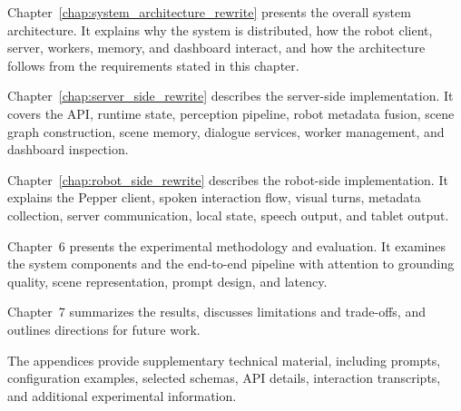 Chapter~\ref{chap:system_architecture_rewrite} presents the overall system architecture. It explains why the system is distributed, how the robot client, server, workers, memory, and dashboard interact, and how the architecture follows from the requirements stated in this chapter.

Chapter~\ref{chap:server_side_rewrite} describes the server-side implementation. It covers the API, runtime state, perception pipeline, robot metadata fusion, scene graph construction, scene memory, dialogue services, worker management, and dashboard inspection.

Chapter~\ref{chap:robot_side_rewrite} describes the robot-side implementation. It explains the Pepper client, spoken interaction flow, visual turns, metadata collection, server communication, local state, speech output, and tablet output.

Chapter~6 presents the experimental methodology and evaluation. It examines the system components and the end-to-end pipeline with attention to grounding quality, scene representation, prompt design, and latency.

Chapter~7 summarizes the results, discusses limitations and trade-offs, and outlines directions for future work.

The appendices provide supplementary technical material, including prompts, configuration examples, selected schemas, API details, interaction transcripts, and additional experimental information.
